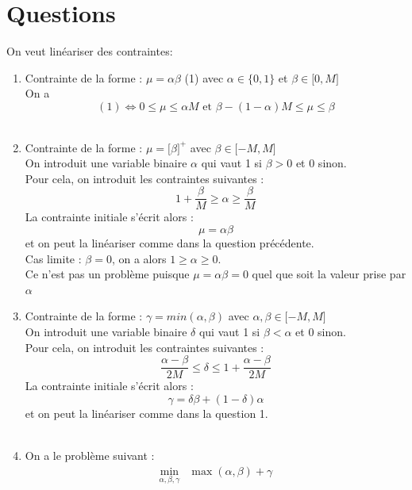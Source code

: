 \documentclass[a4paper,12pt]{article}
\begin{document}
\section{Questions}
On veut linéariser des contraintes:
\\
\begin {enumerate}
\item { 
    Contrainte de la forme : $\mu = \alpha \beta$ (1) avec $\alpha \in \lbrace 0,1 \rbrace$ et $\beta \in \lbrack 0, M \rbrack$ \\ 
    On a  $$(1) \iff 0 \leq \mu \leq \alpha M \text{  et  } \beta - (1 - \alpha)M \leq \mu \leq \beta$$
    }
\\
\item {
    Contrainte de la forme : $ \mu = \lbrack \beta \rbrack ^+$ avec $\beta \in \lbrack -M, M \rbrack$ \\
    On introduit une variable binaire $\alpha$ qui vaut 1 si $\beta > 0$ et 0 sinon. \\
    Pour cela, on introduit les contraintes suivantes :
    $$ 1 + \frac{\beta}{M} \geq \alpha \geq \frac{\beta}{M}$$
    La contrainte initiale s'écrit alors :
    $$ \mu = \alpha \beta $$
    et on peut la linéariser comme dans la question précédente. \\
    Cas limite : $\beta = 0$, on a alors $1 \geq \alpha \geq 0$. \\
    Ce n'est pas un problème puisque $\mu = \alpha \beta = 0$ quel que soit la valeur prise par $\alpha$
    }
\\
\item {
    Contrainte de la forme : $ \gamma = min(\alpha, \beta)$ avec $\alpha, \beta \in \lbrack -M, M \rbrack$ \\
    On introduit une variable binaire $\delta$ qui vaut 1 si $\beta < \alpha$ et 0 sinon. \\
    Pour cela, on introduit les contraintes suivantes :
    $$ \frac{\alpha - \beta}{2M} \leq \delta \leq 1 + \frac{\alpha - \beta}{2M}$$
    La contrainte initiale s'écrit alors :
    $$ \gamma = \delta \beta + (1 - \delta) \alpha $$
    et on peut la linéariser comme dans la question 1. \\
}
\\
\item {
    On a le problème suivant : 
    \begin{equation}
        \begin{aligned}
            \min _{\alpha, \beta, \gamma} & \max (\alpha, \beta) + \gamma \\

\end{aligned}
\end{equation}}
\end{enumerate}
\end{document}

